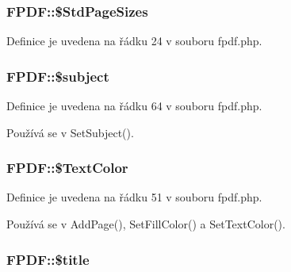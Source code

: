 \hypertarget{class_f_p_d_f_a8cfbaabd6e5ec70a7d074323f2295a41}{
\subsubsection[{\$\-Std\-Page\-Sizes}]{\setlength{\rightskip}{0pt plus 5cm}F\-P\-D\-F\-::\$\-Std\-Page\-Sizes}}\label{class_f_p_d_f_a8cfbaabd6e5ec70a7d074323f2295a41}


Definice je uvedena na řádku 24 v souboru fpdf.\-php.

\hypertarget{class_f_p_d_f_a01809a20cac7b1b9123141262ac881e2}{
\subsubsection[{\$subject}]{\setlength{\rightskip}{0pt plus 5cm}F\-P\-D\-F\-::\$subject}}\label{class_f_p_d_f_a01809a20cac7b1b9123141262ac881e2}


Definice je uvedena na řádku 64 v souboru fpdf.\-php.



Používá se v Set\-Subject().

\hypertarget{class_f_p_d_f_a258b7f98af80620e2d2425f75c1734ac}{
\subsubsection[{\$\-Text\-Color}]{\setlength{\rightskip}{0pt plus 5cm}F\-P\-D\-F\-::\$\-Text\-Color}}\label{class_f_p_d_f_a258b7f98af80620e2d2425f75c1734ac}


Definice je uvedena na řádku 51 v souboru fpdf.\-php.



Používá se v Add\-Page(), Set\-Fill\-Color() a Set\-Text\-Color().

\hypertarget{class_f_p_d_f_a1a9653841a04eab8f7792dc620ad768f}{
\subsubsection[{\$title}]{\setlength{\rightskip}{0pt plus 5cm}F\-P\-D\-F\-::\$title}}\label{class_f_p_d_f_a1a9653841a04eab8f7792dc620ad768f}


